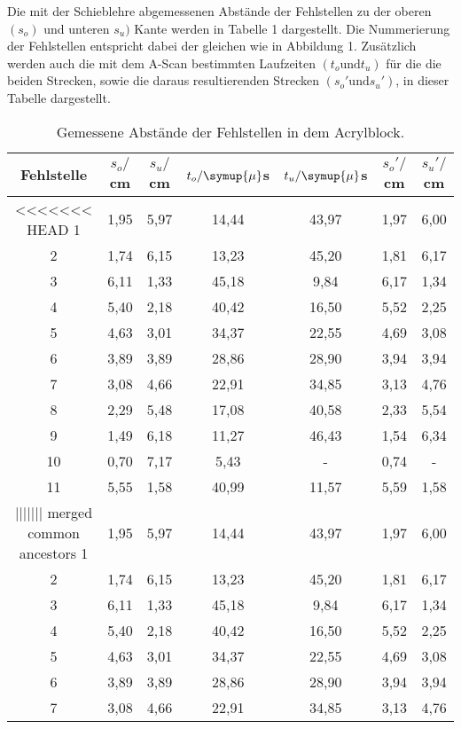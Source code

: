 Die mit der Schieblehre abgemessenen Abstände der Fehlstellen zu der oberen $(s_o)$ und unteren $s_u)$ Kante werden in Tabelle 1 dargestellt. Die Nummerierung der
Fehlstellen entspricht dabei der gleichen wie in Abbildung 1. Zusätzlich werden auch die mit dem A-Scan bestimmten Laufzeiten $(t_o \text{und} t_u)$ für die
die beiden Strecken, sowie die daraus resultierenden Strecken $(s_o' \text{und} s_u')$, in dieser Tabelle dargestellt.
\begin{table}[H]
  \centering
  \caption{Gemessene Abstände der Fehlstellen in dem Acrylblock.}
  \label{tab:spannung1}
  \begin{tabular}{c c c c c c c}
    \toprule
  Fehlstelle & $s_o/$cm & $s_u/$cm & $t_o/\symup{\mu}$s & $t_u/\symup{\mu}$s & $s_o'/$cm & $s_u'/$cm  \\
    \midrule
<<<<<<< HEAD
    1  &  1,95 & 5,97 & 14,44 & 43,97 & 1,97 & 6,00    \\
    2  &  1,74 & 6,15 & 13,23 & 45,20 & 1,81 & 6,17    \\
    3  &  6,11 & 1,33 & 45,18 & 9,84  & 6,17 & 1,34    \\
    4  &  5,40 & 2,18 & 40,42 & 16,50 & 5,52 & 2,25    \\
    5  &  4,63 & 3,01 & 34,37 & 22,55 & 4,69 & 3,08    \\
    6  &  3,89 & 3,89 & 28,86 & 28,90 & 3,94 & 3,94    \\
    7  &  3,08 & 4,66 & 22,91 & 34,85 & 3,13 & 4,76    \\
    8  &  2,29 & 5,48 & 17,08 & 40,58 & 2,33 & 5,54    \\
    9  &  1,49 & 6,18 & 11,27 & 46,43 & 1,54 & 6,34    \\
    10 &  0,70 & 7,17 & 5,43  & -     & 0,74 & -     \\
    11 &  5,55 & 1,58 & 40,99 & 11,57 & 5,59 & 1,58    \\
||||||| merged common ancestors
    1  &  1,95 & 5,97 & 14,44 & 43,97 & 1,97 & 6,00 &   \\
    2  &  1,74 & 6,15 & 13,23 & 45,20 & 1,81 & 6,17 &   \\
    3  &  6,11 & 1,33 & 45,18 & 9,84  & 6,17 & 1,34 &   \\
    4  &  5,40 & 2,18 & 40,42 & 16,50 & 5,52 & 2,25 &   \\
    5  &  4,63 & 3,01 & 34,37 & 22,55 & 4,69 & 3,08 &   \\
    6  &  3,89 & 3,89 & 28,86 & 28,90 & 3,94 & 3,94 &   \\
    7  &  3,08 & 4,66 & 22,91 & 34,85 & 3,13 & 4,76 &   \\

\end{tabular}
\end{table}
